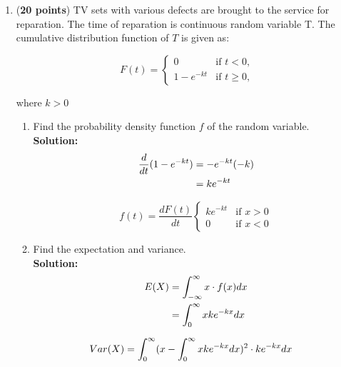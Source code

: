 \documentclass[a4paper]{article}
\begin{document}
\begin{enumerate}
\begin{enumerate}
	
	
	
\end{enumerate}







\item (\textbf{20 points}) TV sets with various defects are brought to the service for reparation. The time of reparation is continuous random variable T. The cumulative distribution function of $T$ is given as:


\[
 F(t) = 
  \begin{cases} 
   0 & \text{if } t < 0,\\
   1 - e^{-kt} & \text{if } t \geq 0,
  \end{cases}
\]
\begin{center}
where $k > 0$
\end{center}

\newpage

\begin{enumerate}
	\item Find the probability density function $f$ of the random variable.\\
	\textbf{Solution:}\\


\begin{align}
	\frac{d}{dt} (1 - e^{-kt}) &= -e^{-kt}(-k)\notag\\
	&= ke^{-kt}\notag
\end{align}



\[
 f(t) = \frac{dF(t)}{dt}
  \begin{cases} 
    ke^{-kt} & \text{if } x > 0\\
   0 & \text{if } x < 0
  \end{cases}
\]
\vspace{1em}


	\item Find the expectation and variance.\\
	\textbf{Solution:}\\
			
\begin{align}
E(X) &= \int_{-\infty}^{\infty} x \cdot f(x)dx\notag\\
	 &= \int_0^\infty x ke^{-kx}dx\notag 
\end{align}	
	
	
\begin{align}
Var(X) &= \int_{0}^{\infty} (x - \int_0^\infty x ke^{-kx}dx)^2 \cdot ke^{-kx}dx\notag
\end{align}
	

\end{enumerate}
\end{enumerate}
\end{document}
